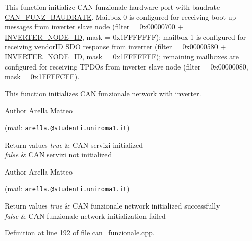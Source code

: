 This function initialize C\-A\-N funzionale hardware port with baudrate \hyperlink{common_8h_adee7e3800c996a5a977034531d94570d}{C\-A\-N\-\_\-\-F\-U\-N\-Z\-\_\-\-B\-A\-U\-D\-R\-A\-T\-E}. Mailbox 0 is configured for receiving boot-\/up messages from inverter slave node (filter = 0x00000700 + \hyperlink{group___c_a_n__funzionale__group_ga59ea82aec4abe07072cbdad555a8c1b9}{I\-N\-V\-E\-R\-T\-E\-R\-\_\-\-N\-O\-D\-E\-\_\-\-I\-D}, mask = 0x1\-F\-F\-F\-F\-F\-F\-F); mailbox 1 is configured for receiving vendor\-I\-D S\-D\-O response from inverter (filter = 0x00000580 + \hyperlink{group___c_a_n__funzionale__group_ga59ea82aec4abe07072cbdad555a8c1b9}{I\-N\-V\-E\-R\-T\-E\-R\-\_\-\-N\-O\-D\-E\-\_\-\-I\-D}, mask = 0x1\-F\-F\-F\-F\-F\-F\-F); remaining mailboxes are configured for receiving T\-P\-D\-Os from inverter slave node (filter = 0x00000080, mask = 0x1\-F\-F\-F\-F\-C\-F\-F). 

This function initializes C\-A\-N funzionale network with inverter.

\begin{DoxyAuthor}{Author}
Arella Matteo \par
 (mail\-: \href{mailto:arella.1646983@studenti.uniroma1.it}{\tt arella.@studenti.\-uniroma1.\-it})
\end{DoxyAuthor}

\begin{DoxyRetVals}{Return values}
{\em true} & C\-A\-N servizi initialized \\
\hline
{\em false} & C\-A\-N servizi not initialized\\
\hline
\end{DoxyRetVals}
\begin{DoxyAuthor}{Author}
Arella Matteo \par
 (mail\-: \href{mailto:arella.1646983@studenti.uniroma1.it}{\tt arella.@studenti.\-uniroma1.\-it})
\end{DoxyAuthor}

\begin{DoxyRetVals}{Return values}
{\em true} & C\-A\-N funzionale network initialized successfully \\
\hline
{\em false} & C\-A\-N funzionale network initialization failed \\
\hline
\end{DoxyRetVals}


Definition at line 192 of file can\-\_\-funzionale.\-cpp.

